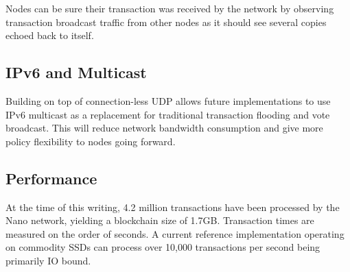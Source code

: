 Nodes can be sure their transaction was received by the network by observing transaction broadcast traffic from other nodes as it should see several copies echoed back to itself.

\subsection{IPv6 and Multicast}
Building on top of connection-less UDP allows future implementations to use IPv6 multicast as a replacement for traditional transaction flooding and vote broadcast. This will reduce network bandwidth consumption and give more policy flexibility to nodes going forward.

\subsection{Performance}
At the time of this writing, 4.2 million transactions have been processed by the Nano network, yielding a blockchain size of 1.7GB. Transaction times are measured on the order of seconds. A current reference implementation operating on commodity SSDs can process over 10,000 transactions per second being primarily IO bound.
